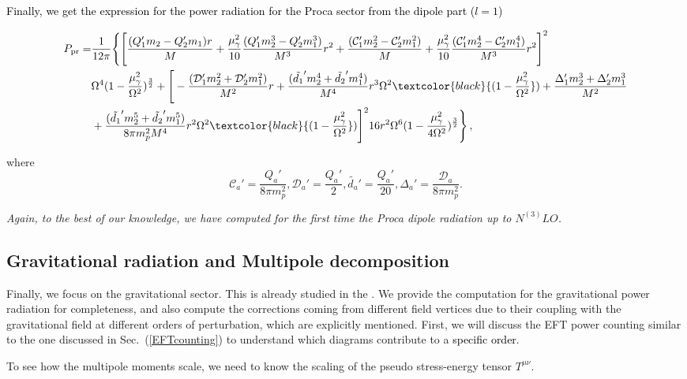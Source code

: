 \textcolor{black}{Finally, we get the expression for the power radiation  for the Proca sector from the dipole part ($l=1$)}
 \begin{tcolorbox}[thesisresultbox, title=Proca Dipole Radiation]
 \restorethesisbodyformat
 \begin{equation}
 \begin{aligned}
      P_{\text{pr}}=&\frac{1}{12\pi} \Bigg\{\Bigg[\frac{({Q}_1'm_2-{Q}_2'm_1)r}{M}+\frac{\mu_{\gamma}^2}{10}\frac{({Q}_1'm_2^3-{Q}_2'm_1^3)}{M^3}r^2+\frac{(\mathcal{C}_1'm_2^2-\mathcal{C}_2'm_1^2)}{M}+\frac{\mu_{\gamma}^2}{10}\frac{(\mathcal{C}_1'm_2^4-\mathcal{C}_2'm_1^4)}{M^3}r^2\Bigg]^2\\ &
       \Omega^4(1-\frac{\mu_{\gamma}^2}{\Omega^2})^{\frac{3}{2}} +\Bigg[-\frac{(\mathcal{D}_1' m_2^2+\mathcal{D}_2' m_1^2)}{M^2}r
+\frac{(\tilde{d_1}'m_2^4+\tilde{d_2}'m_1^4)}{M^4}r^3\Omega^2\textcolor{black}{(1-\frac{\mu_{\gamma}^2}{\Omega^2}})
+\frac{\Delta'_1m_2^3+\Delta'_2m_1^3}{M^2}\\ &
+\frac{(\tilde{d_1}'m_2^5+\tilde{d_2}' m_1^5)}{8\pi m_p^2 M^4}r^2\Omega^2\textcolor{black}{(1-\frac{\mu_{\gamma}^2}{\Omega^2}})
 \Bigg]^2 16r^2\Omega^6(1-\frac{\mu_{\gamma}^2}{4\Omega^2})^{\frac{3}{2}}\Bigg\}\,,
\end{aligned}
\end{equation}
\end{tcolorbox}
 
 where $$ \mathcal{C}_a'=\frac{Q_a'}{8\pi m_p^2},\mathcal{D}_a'=\frac{Q_a'}{2},\tilde{d_a}'=\frac{Q_a'}{20},\Delta_a'=\frac{\mathcal{D}_a}{8\pi m_p^2}. $$\par 
\textit{Again, to the best of our knowledge, we have computed for the first time the Proca dipole radiation up to  $N^{(3)}LO$.}
\subsection{Gravitational radiation and Multipole decomposition}\label{sec5.5}
Finally, we focus on the gravitational sector. This is already studied in the \cite{Kuntz:2019zef, Levi:2018nxp}. We provide the computation for the gravitational power radiation for completeness, and also compute the corrections coming from different field vertices due to their coupling with the gravitational field at different orders of perturbation, which are explicitly mentioned. 
First, we will discuss the EFT  power counting similar to the one discussed in Sec.~(\ref{EFTcounting}) to understand which diagrams contribute to a \textcolor{black}{specific order}.\par
To see how the multipole moments scale, we need to know the scaling of the pseudo stress-energy tensor $T^{\mu\nu}.$

